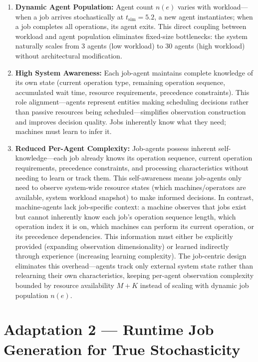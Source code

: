 \begin{enumerate}
\item \textbf{Dynamic Agent Population:} Agent count \( n(e) \) varies with workload—when a job arrives stochastically at \( t_{\text{sim}} = 5.2 \), a new agent instantiates; when a job completes all operations, its agent exits. This direct coupling between workload and agent population eliminates fixed-size bottlenecks: the system naturally scales from 3 agents (low workload) to 30 agents (high workload) without architectural modification.

\item \textbf{High System Awareness:} Each job-agent maintains complete knowledge of its own state (current operation type, remaining operation sequence, accumulated wait time, resource requirements, precedence constraints). This role alignment—agents represent entities making scheduling decisions rather than passive resources being scheduled—simplifies observation construction and improves decision quality. Jobs inherently know what they need; machines must learn to infer it.

\item \textbf{Reduced Per-Agent Complexity:} Job-agents possess inherent self-knowledge—each job already knows its operation sequence, current operation requirements, precedence constraints, and processing characteristics without needing to learn or track them. This self-awareness means job-agents only need to observe system-wide resource states (which machines/operators are available, system workload snapshot) to make informed decisions. In contrast, machine-agents lack job-specific context: a machine observes that jobs exist but cannot inherently know each job's operation sequence length, which operation index it is on, which machines can perform its current operation, or its precedence dependencies. This information must either be explicitly provided (expanding observation dimensionality) or learned indirectly through experience (increasing learning complexity). The job-centric design eliminates this overhead—agents track only external system state rather than relearning their own characteristics, keeping per-agent observation complexity bounded by resource availability \( M + K \) instead of scaling with dynamic job population \( n(e) \).
\end{enumerate}


\section{Adaptation 2 — Runtime Job Generation for True Stochasticity}
\label{sec:stochastic_adaptation}

